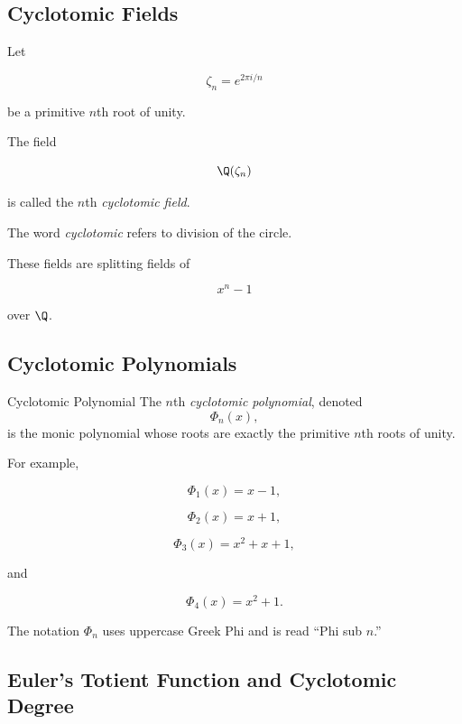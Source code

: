 \subsection{Cyclotomic Fields}
\label{subsec:cyclotomic-fields}

Let

\[ \zeta_n=e^{2\pi i/n} \]

be a primitive \(n\)th root of unity.

The field

\[ \Q(\zeta_n) \]

is called the \(n\)th \emph{cyclotomic field}.

The word \emph{cyclotomic} refers to division of the circle.

These fields are splitting fields of

\[ x^n-1 \]

over \(\Q\).

\subsection{Cyclotomic Polynomials}
\label{subsec:cyclotomic-polynomials}

\begin{definitionbox}{Cyclotomic Polynomial}
The \(n\)th \emph{cyclotomic polynomial}, denoted
\[ \Phi_n(x), \]
is the monic polynomial whose roots are exactly the primitive \(n\)th roots
of unity.
\end{definitionbox}

For example,

\[ \Phi_1(x)=x-1, \]

\[ \Phi_2(x)=x+1, \]

\[ \Phi_3(x)=x^2+x+1, \]

and

\[ \Phi_4(x)=x^2+1. \]

The notation \(\Phi_n\) uses uppercase Greek Phi and is read
``Phi sub \(n\).''

\subsection{Euler's Totient Function and Cyclotomic Degree}
\label{subsec:cyclotomic-degree}

